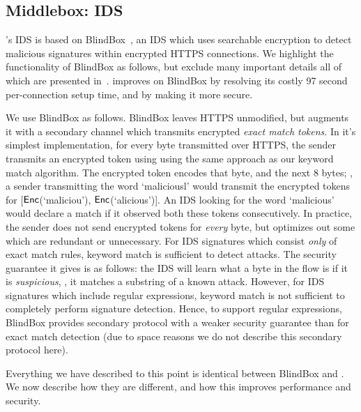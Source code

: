 


\subsection{Middlebox: IDS}\label{sec:ids}
\sys's IDS is based on BlindBox~\cite{blindbox}, an IDS which uses searchable encryption to detect malicious signatures within encrypted HTTPS connections. We highlight the functionality of BlindBox as follows, but exclude many important details all of which are presented in~\cite{blindbox}. \sys improves on BlindBox by resolving its costly 97 second per-connection setup time, and by making it more secure.

We use BlindBox as follows.
BlindBox leaves HTTPS unmodified, but augments it with a secondary channel which transmits encrypted {\it exact match tokens}.
In it's simplest implementation, for every byte transmitted over HTTPS, the sender transmits an encrypted token using using the same approach as our keyword match algorithm.
The encrypted token encodes that byte, and the next 8 bytes; \eg{}, a sender transmitting the word `maliciousl' would transmit the encrypted tokens for [$\mathsf{Enc}$(`maliciou'), $\mathsf{Enc}$(`alicious')].
An IDS looking for the word `malicious' would declare a match if it observed both these tokens consecutively.
In practice, the sender does not send encrypted tokens for {\it every} byte, but optimizes out some which are redundant or unnecessary.
For IDS signatures which consist {\it only} of exact match rules, keyword match is sufficient to detect attacks.
The security guarantee it gives is as follows: the IDS will learn what a byte in the flow is if it is {\it suspicious}, \ie{}, it matches a substring of a known attack.
  However, for IDS signatures which include regular expressions, keyword match is not sufficient to completely perform signature detection.
  Hence, to support regular expressions, BlindBox provides secondary protocol with a weaker security guarantee than for exact match detection (due to space reasons we do not describe this secondary protocol here).

  Everything we have described to this point is identical between BlindBox and \sys. We now describe how they are different, and how this improves performance and security.

